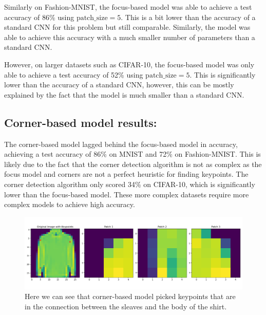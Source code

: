 Similarly on Fashion-MNIST, the focus-based model was able to achieve a test accuracy of 86\% using \(\text{patch\_size} = 5\). This is a bit lower than the accuracy of a standard CNN for this problem but still comparable. Similarly, the model was able to achieve this accuracy with a much smaller number of parameters than a standard CNN.

However, on larger datasets such as CIFAR-10, the focus-based model was only able to achieve a test accuracy of 52\% using \(\text{patch\_size} = 5\). This is significantly lower than the accuracy of a standard CNN, however, this can be mostly explained by the fact that the model is much smaller than a standard CNN.



\subsection{Corner-based model results:}
The corner-based model lagged behind the focus-based model in accuracy, achieving a test accuracy of 86\% on MNIST and 72\% on Fashion-MNIST. This is likely due to the fact that the corner detection algorithm is not as complex as the focus model and corners are not a perfect heuristic for finding keypoints. The corner detection algorithm only scored 34\% on CIFAR-10, which is significantly lower than the focus-based model. These more complex datasets require more complex models to achieve high accuracy.

\begin{figure}[hbt!]
    \centering
    \includegraphics[scale=0.20]{images/corner_on_FashionMNIST.png}
    \caption{Here we can see that corner-based model picked keypoints that are in the connection between the sleaves and the body of the shirt.}
    \label{fig:focus-3}
\end{figure}

